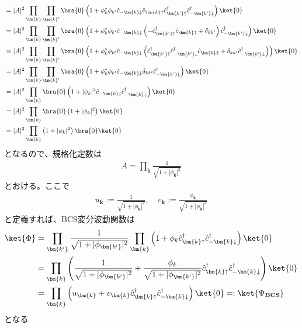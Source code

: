 \documentclass[dvipdfmx, 11pt, a4paper]{jsarticle}
\numberwithin{equation}{section}
\theoremstyle{definition}
\begin{document}
\begin{derivationBox}
\begin{align}
            &= |A|^2\prod_{\bm{k}}\prod_{\bm{k}'} \bra{0}\left( 1 + \phi_{k}^* \phi_{k'} \hat{c}_{-\bm{k}\downarrow} \hat{c}_{\bm{k}\uparrow} \hat{c}_{\bm{k'}\uparrow}^\dagger \hat{c}_{-\bm{k'}\downarrow}^\dagger  \right)  \ket{0} \notag \\
            &= |A|^2\prod_{\bm{k}}\prod_{\bm{k}'} \bra{0}\left( 1 + \phi_{k}^* \phi_{k'} \hat{c}_{-\bm{k}\downarrow} \left( -\hat{c}_{\bm{k'}\uparrow}^\dagger \hat{c}_{\bm{k}\uparrow} + \delta_{kk'}   \right) \hat{c}_{-\bm{k'}\downarrow}^\dagger  \right)  \ket{0} \notag \\
            &= |A|^2\prod_{\bm{k}}\prod_{\bm{k}'} \bra{0}\left( 1 + \phi_{k}^* \phi_{k'} \hat{c}_{-\bm{k}\downarrow} \left( \hat{c}_{\bm{k'}\uparrow}^\dagger \hat{c}_{-\bm{k'}\downarrow}^\dagger \hat{c}_{\bm{k}\uparrow}  + \delta_{kk'} \hat{c}_{-\bm{k'}\downarrow}^\dagger  \right)   \right)  \ket{0} \notag \\
            &= |A|^2\prod_{\bm{k}}\prod_{\bm{k}'} \bra{0}\left( 1 + \phi_{k}^* \phi_{k'} \hat{c}_{-\bm{k}\downarrow}   \delta_{kk'} \hat{c}_{-\bm{k'}\downarrow}^\dagger  \right)     \ket{0} \notag \\
            &= |A|^2\prod_{\bm{k}} \bra{0}\left( 1 +  |\phi_{k}|^2 \hat{c}_{-\bm{k}\downarrow}  \hat{c}_{-\bm{k}\downarrow}^\dagger  \right)     \ket{0} \notag \\
            &= |A|^2\prod_{\bm{k}} \bra{0}\left( 1 +  |\phi_{k}|^2   \right)     \ket{0} \notag \\
            &= |A|^2\prod_{\bm{k}} \left( 1 +  |\phi_{k}|^2   \right)\bra{0}     \ket{0}
        \end{align}
        となるので、規格化定数は
        \begin{align}
            A = \prod_{\bm{k}} \frac{1}{\sqrt{1 + |\phi_{\bm{k}}|^2}}
        \end{align}
        とおける。ここで
        \begin{align}
            u_{\bm{k}} := \frac{1}{\sqrt{1+|\phi_{\bm{k}}|^2}} ,\quad
            v_{\bm{k}} := \frac{\phi_{\bm{k}}}{\sqrt{1+|\phi_{\bm{k}}|^2}}
        \end{align}
        と定義すれば、BCS変分波動関数は
        \begin{align}
             \ket{\Phi} &= \prod_{\bm{k'}} \frac{1}{\sqrt{1 + |\phi_{\bm{k'}}|^2}} \prod_{\bm{k}} \left( 1 + \phi_{k} \hat{c}_{\bm{k}\uparrow}^\dagger \hat{c}_{-\bm{k}\downarrow}^\dagger \right) \ket{0} \notag \\
             &=  \prod_{\bm{k}} \left( \frac{1}{\sqrt{1 + |\phi_{\bm{k'}}|^2}} + \frac{\phi_{k}}{\sqrt{1 + |\phi_{\bm{k'}}|^2}} \hat{c}_{\bm{k}\uparrow}^\dagger \hat{c}_{-\bm{k}\downarrow}^\dagger \right) \ket{0} \notag \\
             &= \prod_{\bm{k}}\left( u_{\bm{k}} + v_{\bm{k}}\hat{c}_{\bm{k}\uparrow}^\dagger \hat{c}_{-\bm{k}\downarrow}^\dagger \right) \ket{0} =: \ket{\Psi_\textbf{BCS}}
        \end{align}
        となる
    \end{derivationBox}
\end{document}
